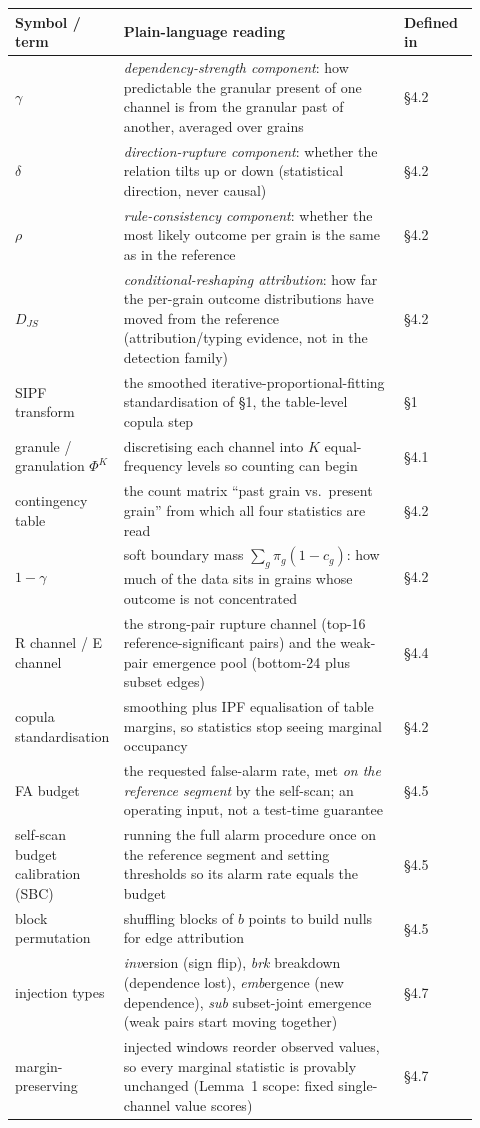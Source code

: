 \documentclass[11pt,a4paper]{article}
\begin{document}
\medskip
\noindent\begin{tabular}{@{}p{0.16\linewidth}p{0.60\linewidth}p{0.16\linewidth}@{}}
\toprule
Symbol / term & Plain-language reading & Defined in \\
\midrule
$\gamma$ & \emph{dependency-strength component}: how predictable the
granular present of one channel is from the granular past of another,
averaged over grains & \S4.2 \\
$\delta$ & \emph{direction-rupture component}: whether the relation
tilts up or down (statistical direction, never causal) & \S4.2 \\
$\rho$ & \emph{rule-consistency component}: whether the most likely
outcome per grain is the same as in the reference & \S4.2 \\
$D_{JS}$ & \emph{conditional-reshaping attribution}: how far the
per-grain outcome distributions have moved from the reference
(attribution/typing evidence, not in the detection family) & \S4.2 \\
SIPF transform & the smoothed iterative-proportional-fitting standardisation of \S1, the table-level copula step & \S1 \\
granule / granulation $\Phi^K$ & discretising each channel into $K$
equal-frequency levels so counting can begin & \S4.1 \\
contingency table & the count matrix ``past grain vs.\ present grain''
from which all four statistics are read & \S4.2 \\
$1-\gamma$ & soft boundary mass $\sum_g \pi_g(1-c_g)$: how much of the
data sits in grains whose outcome is not concentrated & \S4.2 \\
R channel / E channel & the strong-pair rupture channel (top-16
reference-significant pairs) and the weak-pair emergence pool
(bottom-24 plus subset edges) & \S4.4 \\
copula standardisation & smoothing plus IPF equalisation of table
margins, so statistics stop seeing marginal occupancy & \S4.2 \\
FA budget & the requested false-alarm rate, met \emph{on the reference
segment} by the self-scan; an operating input, not a test-time
guarantee & \S4.5 \\
self-scan budget calibration (SBC) & running the full alarm procedure once on the
reference segment and setting thresholds so its alarm rate equals the
budget & \S4.5 \\
block permutation & shuffling blocks of $b$ points to build nulls for
edge attribution & \S4.5 \\
injection types & \emph{inv}ersion (sign flip), \emph{brk} breakdown
(dependence lost), \emph{emb}ergence (new dependence), \emph{sub}
subset-joint emergence (weak pairs start moving together) & \S4.7 \\
margin-preserving & injected windows reorder observed values, so every
marginal statistic is provably unchanged (Lemma~1 scope: fixed
single-channel value scores) & \S4.7 \\
\bottomrule
\end{tabular}
\end{document}
